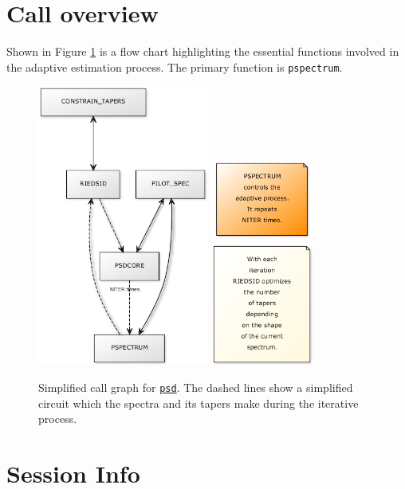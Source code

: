 \documentclass[10pt]{article}\usepackage[]{graphicx}\usepackage[]{color}
\newcommand{\Rcmd}[1]{\texttt{#1}}
\newcommand{\psd}[0]{\href{http://www.github.com/abarbour/psd/}{\color{blue}\Rcmd{psd}}}
\begin{document}

\section{Call overview}

Shown
in Figure \ref{fig:calls}
is a flow chart 
highlighting the essential
functions involved in the adaptive estimation
process. The primary function is \Rcmd{pspectrum}.

\begin{figure}[!htbp]
 \centering
 \includegraphics[width=0.5\textwidth]{yuml_d.png}%
 \includegraphics[width=0.3\textwidth]{yuml_n.png}
 \caption{Simplified call graph for \psd{}. The dashed lines show a
 simplified circuit
 which the spectra and its tapers make during the iterative process.}
 \label{fig:calls}
\end{figure}

\pagebreak
\section*{Session Info}



\end{document}
